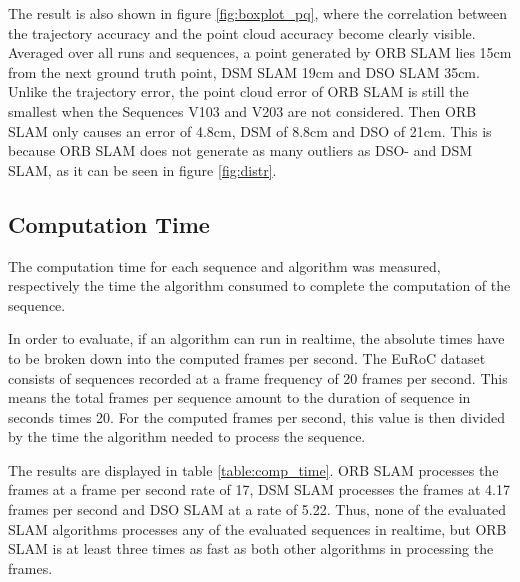 	The result is also shown in figure \ref{fig:boxplot_pq}, where the correlation between the trajectory accuracy and the point cloud accuracy become clearly 
	visible. Averaged over all runs and sequences, a point generated by ORB SLAM lies 15cm from the next ground truth point, DSM SLAM 19cm and DSO SLAM 35cm. 
	Unlike the trajectory error, the point cloud error of ORB SLAM is still the smallest when the Sequences V103 and V203 are not considered. Then ORB SLAM 
	only causes an error of 4.8cm, DSM of 8.8cm and DSO of 21cm. This is because ORB SLAM does not generate as many outliers as DSO- and DSM SLAM, as it can be seen 
	in figure \ref{fig:distr}.
	
	
	

\subsection{Computation Time}

	The computation time for each sequence and algorithm was measured, respectively the time the algorithm consumed to complete the computation of the sequence.
	
	In order to evaluate, if an algorithm can run in realtime, the absolute times have to be broken down into the computed frames per second.
	The EuRoC dataset consists of sequences recorded at a frame frequency of 20 frames per second. This means the total frames per sequence 
	amount to the duration of sequence in seconds times 20. For the computed frames per second, this value is then divided by the time the algorithm needed 
	to process the sequence. 
	
	The results are displayed in table \ref{table:comp_time}. ORB SLAM processes the frames at a frame per second rate of 17, 
	DSM SLAM processes the frames at 4.17 frames per second and DSO SLAM at a rate of 5.22. Thus, 
	none of the evaluated SLAM algorithms processes any of the evaluated sequences in realtime, but ORB SLAM is at least 
	three times as fast as both other algorithms in processing the frames. 
	
